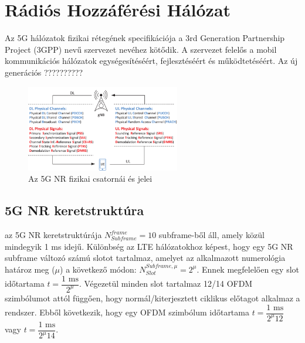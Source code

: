\section{Rádiós Hozzáférési Hálózat}

Az 5G hálózatok fizikai rétegének specifikációja a 3rd Generation Partnership Project (3GPP) nevű szervezet nevéhez kötődik.
A szervezet felelős a mobil kommunikációs hálózatok egységesítéséért, fejlesztéséért és működtetéséért.
Az új generációs ??????????

\begin{figure}[h]
    \centering
    \includegraphics[width=0.6\textwidth]{jelek.png}
    \caption{Az 5G NR fizikai csatornái és jelei}
    \label{fig:jelek}
\end{figure}

\subsection{5G NR keretstruktúra}


az 5G NR keretstruktúrája $N_{Subframe}^{frame}=10$ subframe-ből áll, amely közül mindegyik 1 ms idejű.
Különbség az LTE hálózatokhoz képest, hogy egy 5G NR subframe változó számú slotot tartalmaz, amelyet az alkalmazott numerológia határoz meg ($\mu$) a következő módon: $N_{Slot}^{Subframe,\mu}= 2 ^\mu$.
Ennek megfelelően egy slot időtartama $ t = \dfrac{1 \text{ ms}}{2^\mu}$.
Végezetül minden slot tartalmaz 12/14 OFDM szimbólumot attól függően, hogy normál/kiterjesztett ciklikus előtagot alkalmaz a rendszer.
Ebből következik, hogy egy OFDM szimbólum időtartama $ t = \dfrac{1 \text{ ms}}{2^\mu 12}$ vagy $ t = \dfrac{1 \text{ ms}}{2^\mu 14}$.

